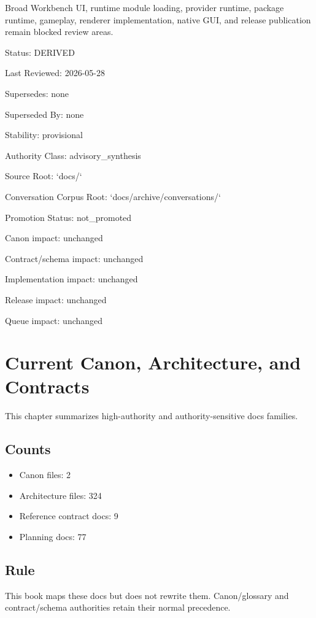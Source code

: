 \documentclass[11pt,a4paper]{report}
\begin{document}
Broad Workbench UI, runtime module loading, provider runtime, package runtime, gameplay, renderer implementation, native GUI, and release publication remain blocked review areas.\allowbreak{}



Status: DERIVED

Last Reviewed: 2026-\allowbreak{}05-\allowbreak{}28

Supersedes: none

Superseded By: none

Stability: provisional

Authority Class: advisory\_synthesis

Source Root: `docs/\allowbreak{}`

Conversation Corpus Root: `docs/\allowbreak{}archive/\allowbreak{}conversations/\allowbreak{}`

Promotion Status: not\_promoted

Canon impact: unchanged

Contract/\allowbreak{}schema impact: unchanged

Implementation impact: unchanged

Release impact: unchanged

Queue impact: unchanged


\chapter{Current Canon, Architecture, and Contracts}

This chapter summarizes high-\allowbreak{}authority and authority-\allowbreak{}sensitive docs families.\allowbreak{}


\section{Counts}

\begin{itemize}
\item Canon files: 2
\item Architecture files: 324
\item Reference contract docs: 9
\item Planning docs: 77
\end{itemize}

\section{Rule}

This book maps these docs but does not rewrite them.\allowbreak{} Canon/\allowbreak{}glossary and contract/\allowbreak{}schema authorities retain their normal precedence.\allowbreak{}
\end{document}
